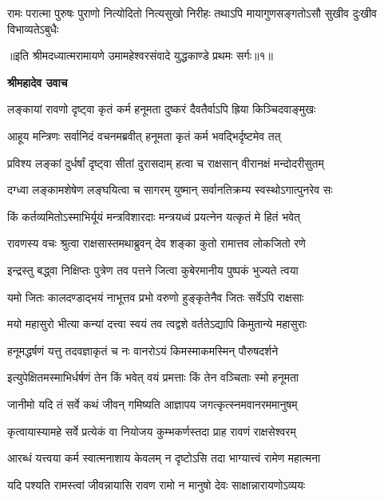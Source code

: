 \fourlineindentedshloka
{रामः परात्मा पुरुषः पुराणो}
{नित्योदितो नित्यसुखो निरीहः}
{तथाऽपि मायागुणसङ्गतोऽसौ}
{सुखीव दुःखीव विभाव्यतेऽबुधैः} %

{॥इति श्रीमदध्यात्मरामायणे उमामहेश्वरसंवादे युद्धकाण्डे
प्रथमः सर्गः॥१॥
}




\textbf{श्रीमहादेव उवाच}

\twolineshloka
{लङ्कायां रावणो दृष्ट्वा कृतं कर्म हनूमता}
{दुष्करं दैवतैर्वाऽपि ह्रिया किञ्चिदवाङ्मुखः} %

\twolineshloka
{आहूय मन्त्रिणः सर्वानिदं वचनमब्रवीत्}
{हनूमता कृतं कर्म भवद्भिर्दृष्टमेव तत्} %

\twolineshloka
{प्रविश्य लङ्कां दुर्धर्षां दृष्ट्वा सीतां दुरासदाम्}
{हत्वा च राक्षसान् वीरानक्षं मन्दोदरीसुतम्} %

\twolineshloka
{दग्ध्वा लङ्कामशेषेण लङ्घयित्वा च सागरम्}
{युष्मान् सर्वानतिक्रम्य स्वस्थोऽगात्पुनरेव सः} %

\twolineshloka
{किं कर्तव्यमितोऽस्माभिर्यूयं मन्त्रविशारदाः}
{मन्त्रयध्वं प्रयत्नेन यत्कृतं मे हितं भवेत्} %

\twolineshloka
{रावणस्य वचः श्रुत्वा राक्षसास्तमथाब्रुवन्}
{देव शङ्का कुतो रामात्तव लोकजितो रणे} %

\twolineshloka
{इन्द्रस्तु बद्ध्वा निक्षिप्तः पुत्रेण तव पत्तने}
{जित्वा कुबेरमानीय पुष्पकं भुज्यते त्वया} %

\twolineshloka
{यमो जितः कालदण्डाद्भयं नाभूत्तव प्रभो}
{वरुणो हुङ्कृतेनैव जितः सर्वेऽपि राक्षसाः} %

\twolineshloka
{मयो महासुरो भीत्या कन्यां दत्त्वा स्वयं तव}
{त्वद्वशे वर्ततेऽद्यापि किमुतान्ये महासुराः} %

\twolineshloka
{हनूमद्धर्षणं यत्तु तदवज्ञाकृतं च नः}
{वानरोऽयं किमस्माकमस्मिन् पौरुषदर्शने} %

\twolineshloka
{इत्युपेक्षितमस्माभिर्धर्षणं तेन किं भवेत्}
{वयं प्रमत्ताः किं तेन वञ्चिताः स्मो हनूमता} %

\twolineshloka
{जानीमो यदि तं सर्वे कथं जीवन् गमिष्यति}
{आज्ञापय जगत्कृत्स्नमवानरममानुषम्} %

\twolineshloka
{कृत्वायास्यामहे सर्वे प्रत्येकं वा नियोजय}
{कुम्भकर्णस्तदा प्राह रावणं राक्षसेश्वरम्} %

\twolineshloka
{आरब्धं यत्त्वया कर्म स्वात्मनाशाय केवलम्}
{न दृष्टोऽसि तदा भाग्यात्त्वं रामेण महात्मना} %

\twolineshloka
{यदि पश्यति रामस्त्वां जीवन्नायासि रावण}
{रामो न मानुषो देवः साक्षान्नारायणोऽव्ययः} %

